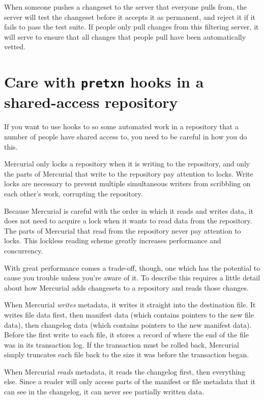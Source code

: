 When someone pushes a changeset to the server that everyone pulls
from, the server will test the changeset before it accepts it as
permanent, and reject it if it fails to pass the test suite.  If
people only pull changes from this filtering server, it will serve to
ensure that all changes that people pull have been automatically
vetted.

\section{Care with \texttt{pretxn} hooks in a shared-access repository}

If you want to use hooks to so some automated work in a repository
that a number of people have shared access to, you need to be careful
in how you do this.

Mercurial only locks a repository when it is writing to the
repository, and only the parts of Mercurial that write to the
repository pay attention to locks.  Write locks are necessary to
prevent multiple simultaneous writers from scribbling on each other's
work, corrupting the repository.

Because Mercurial is careful with the order in which it reads and
writes data, it does not need to acquire a lock when it wants to read
data from the repository.  The parts of Mercurial that read from the
repository never pay attention to locks.  This lockless reading scheme
greatly increases performance and concurrency.

With great performance comes a trade-off, though, one which has the
potential to cause you trouble unless you're aware of it.  To describe
this requires a little detail about how Mercurial adds changesets to a
repository and reads those changes.

When Mercurial \emph{writes} metadata, it writes it straight into the
destination file.  It writes file data first, then manifest data
(which contains pointers to the new file data), then changelog data
(which contains pointers to the new manifest data).  Before the first
write to each file, it stores a record of where the end of the file
was in its transaction log.  If the transaction must be rolled back,
Mercurial simply truncates each file back to the size it was before the
transaction began.

When Mercurial \emph{reads} metadata, it reads the changelog first,
then everything else.  Since a reader will only access parts of the
manifest or file metadata that it can see in the changelog, it can
never see partially written data.

